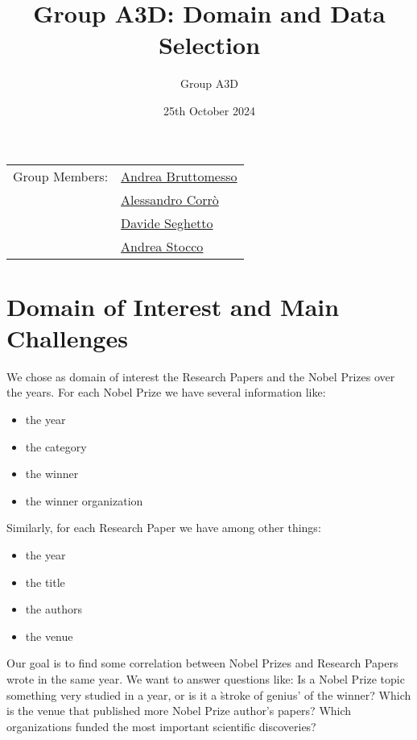 \documentclass{article}
\title{Group A3D: Domain and Data Selection}
\author{Group A3D}
\date{25th October 2024}
\begin{document}
\maketitle

\noindent\begin{tabular}{@{}ll}
	Group Members: & \href{mailto:andrea.bruttomesso.1@studenti.unipd.it}{Andrea Bruttomesso} \\
	               & \href{mailto:alessandro.corro.1@studenti.unipd.it}{Alessandro Corr\`o}   \\
	               & \href{mailto:davide.seghetto@studenti.unipd.it}{Davide Seghetto}         \\
	               & \href{mailto:andrea.stocco.8@studenti.unipd.it}{Andrea Stocco}           \\
\end{tabular}

\section*{Domain of Interest and Main Challenges}
We chose as domain of interest the Research Papers and the Nobel Prizes over the years.
For each Nobel Prize we have several information like:
\begin{itemize}
	\item the year
	\item the category
	\item the winner
	\item the winner organization
\end{itemize}
Similarly, for each Research Paper we have among other things:
\begin{itemize}
	\item the year
	\item the title
	\item the authors
	\item the venue
\end{itemize}

Our goal is to find some correlation between Nobel Prizes and Research Papers wrote in
the same year. We want to answer questions like: Is a Nobel Prize topic something very studied in a year, or is it a \`stroke of genius'
of the winner? Which is the venue that published more Nobel Prize author's papers?
Which organizations funded the most important scientific discoveries?

\end{document}
